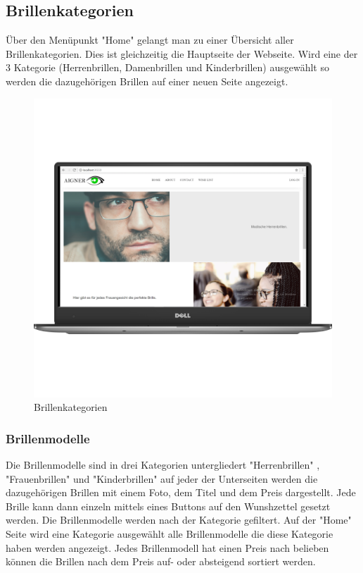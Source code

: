 \subsection{Brillenkategorien}
Über den Menüpunkt "Home" gelangt man zu einer Übersicht aller Brillenkategorien. Dies ist gleichzeitig die Hauptseite der Webseite. Wird eine der 3 Kategorie (Herrenbrillen, Damenbrillen und Kinderbrillen) ausgewählt so werden die dazugehörigen Brillen auf einer neuen Seite angezeigt.

\begin{figure}[H]
\begin{center}
	\includegraphics[scale=.2]{images/Index.png}
\end{center}
	\caption{Brillenkategorien}
	\label{fig:sample}
\end{figure}
\pagebreak
\subsubsection{Brillenmodelle}
Die Brillenmodelle sind in drei Kategorien untergliedert "Herrenbrillen" , "Frauenbrillen" und "Kinderbrillen" auf jeder der Unterseiten werden die dazugehörigen Brillen mit einem Foto, dem Titel und dem Preis dargestellt. Jede Brille kann dann einzeln mittels eines Buttons auf den Wunshzettel gesetzt werden.
Die Brillenmodelle werden nach der Kategorie gefiltert. Auf der "Home" Seite wird eine Kategorie ausgewählt alle Brillenmodelle die diese Kategorie haben werden angezeigt.
Jedes Brillenmodell hat einen Preis nach belieben können die Brillen nach dem Preis auf- oder absteigend sortiert werden. 

